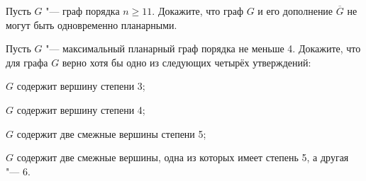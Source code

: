 \documentclass[12pt, a4paper]{article}
\begin{document}
\begin{problemList}
\bigskip

{Пусть $G$ "--- граф порядка $n \ge 11$.
Докажите, что граф $G$ и его дополнение $\overline{G}$ не могут быть одновременно планарными.}

\bigskip

{%
Пусть $G$ "--- максимальный планарный граф порядка не меньше 4.
Докажите, что для графа $G$ верно хотя бы одно из следующих четырёх утверждений:
\begin{russianEnumerate}
    \item $G$ содержит вершину степени 3;
    \item $G$ содержит вершину степени 4;
    \item $G$ содержит две смежные вершины степени 5;
    \item $G$ содержит две смежные вершины, одна из которых имеет степень 5, а другая "--- 6.
\end{russianEnumerate}
}

\end{problemList}
\end{document}
